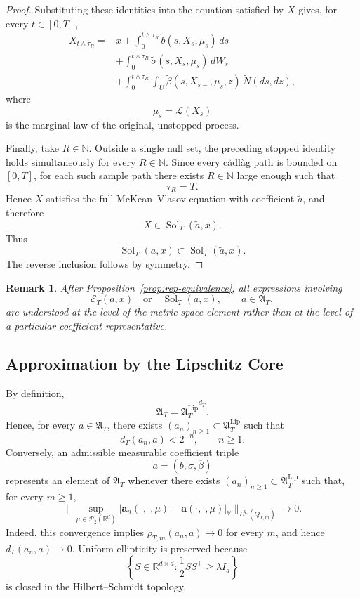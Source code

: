 \documentclass[12pt,oneside, reqno]{amsart}
\newtheorem{remark}[theorem]{Remark}
\numberwithin{equation}{section}
\begin{document}
\begin{proof}
		Substituting these identities into the equation satisfied by \(X\)
		gives, for every \(t\in[0,T]\),
		\[
		\begin{aligned}
			X_{t\wedge\tau_R}
			={}&x
			+\int_0^{t\wedge\tau_R}
			\widetilde b(s,X_s,\mu_s)\,ds
			\\
			&+\int_0^{t\wedge\tau_R}
			\widetilde\sigma(s,X_s,\mu_s)\,dW_s
			\\
			&+\int_0^{t\wedge\tau_R}\int_U
			\widetilde\beta(s,X_{s-},\mu_s,z)\,
			\widetilde N(ds,dz),
		\end{aligned}
		\]
		where
		\[
		\mu_s=\mathcal L(X_s)
		\]
		is the marginal law of the original, unstopped process.
		
		Finally, take \(R\in\mathbb N\). Outside a single null set, the
		preceding stopped identity holds simultaneously for every
		\(R\in\mathbb N\). Since every c\`adl\`ag path is bounded on
		\([0,T]\), for each such sample path there exists \(R\in\mathbb N\)
		large enough such that
		\[
		\tau_R=T.
		\]
		Hence \(X\) satisfies the full McKean--Vlasov equation with coefficient
		\(\widetilde a\), and therefore
		\[
		X\in\operatorname{Sol}_T(\widetilde a,x).
		\]
		Thus
		\[
		\operatorname{Sol}_T(a,x)
		\subset
		\operatorname{Sol}_T(\widetilde a,x).
		\]
		The reverse inclusion follows by symmetry.
	\end{proof}
	
	
	\begin{remark}
		After Proposition~\ref{prop:rep-equivalence}, all
		expressions involving
		\[
		\mathcal E_T(a,x)
		\quad\text{or}\quad
		\operatorname{Sol}_T(a,x),
		\qquad a\in\mathfrak A_T,
		\]
		are understood at the level of the metric-space element rather than
		at the level of a particular coefficient representative.
	\end{remark}
	
	\subsection{Approximation by the Lipschitz Core}
	
	
	
	
	By definition,
	\[
	\mathfrak A_T
	=
	\overline{\mathfrak A_T^{\mathrm{Lip}}}^{d_T}.
	\]
	Hence, for every $a\in\mathfrak A_T$, there exists
	$(a_n)_{n\geq 1}\subset\mathfrak A_T^{\mathrm{Lip}}$ such that
	\[
	d_T(a_n,a)<2^{-n},
	\qquad n\geq 1.
	\]
	Conversely, an admissible measurable coefficient triple
	\[
	a=(b,\sigma,\overline\beta)
	\]
	represents an element of $\mathfrak A_T$ whenever there exists
	$(a_n)_{n\geq 1}\subset\mathfrak A_T^{\mathrm{Lip}}$ such that, for
	every $m\geq 1$,
	\[
	\|
	\sup_{\mu\in\mathcal P_2(\mathbb R^d)}
	\left|
	\mathbf a_n(\cdot,\cdot,\mu)
	-
	\mathbf a(\cdot,\cdot,\mu)
	\right|_{\mathbb V}
	\|_{L^{q_\ast}(Q_{T,m})}
	\longrightarrow 0.
	\]
	Indeed, this convergence implies
	$\rho_{T,m}(a_n,a)\to 0$ for every $m$, and hence
	$d_T(a_n,a)\to 0$. Uniform ellipticity is preserved because
	\[
	\left\{
	S\in\mathbb R^{d\times d}:
	\frac12SS^\top\geq\lambda I_d
	\right\}
	\]
	is closed in the Hilbert--Schmidt topology.
	
\end{document}
